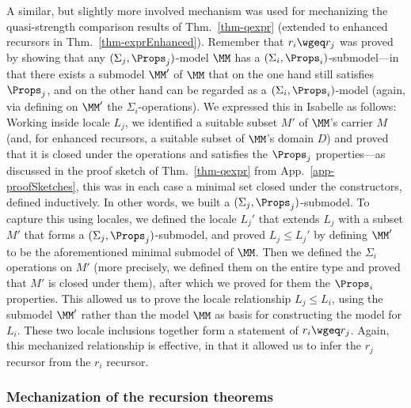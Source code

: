 A similar, but slightly more involved mechanism was used for mechanizing 
the quasi-strength comparison results of Thm.~\ref{thm-qexpr} 
(extended to enhanced recursors in Thm.~\ref{thm-exprEnhanced}). Remember that $r_i \wgeq r_j$ was proved by showing that any $(\Sigma_j,\Props_j)$-model $\MM$ has a $(\Sigma_i,\Props_i)$-submodel---in that there exists a submodel $\MM'$ of $\MM$ that on the one hand still satisfies $\Props_j$, and on the other hand can be regarded as a $(\Sigma_i,\Props_i)$-model (again, via defining on $\MM'$ the $\Sigma_i$-operations). We expressed this in Isabelle as follows: %
Working inside locale $L_j$, we identified a suitable subset $M'$ of $\MM$'s carrier $M$ (and, for enhanced recursors, a suitable subset of $\MM$'s domain 
$D$) and proved that it is closed under the operations and satisfies the $\Props_j$ properties---as discussed in the proof sketch of Thm.~\ref{thm-qexpr}  %
from App.~\ref{app-proofSketches}, this was in each case a minimal  set closed under the constructors, defined inductively. %
In other words, we built a $(\Sigma_j,\Props_j)$-submodel. To capture this using locales, we defined the locale $L_j'$ that extends $L_j$ with a subset $M'$ that forms a $(\Sigma_j,\Props_j)$-submodel, and proved $L_j \leq L_j'$ by defining $\MM'$ to be the aforementioned minimal submodel of $\MM$.  Then we defined the 
$\Sigma_i$ operations on $M'$ (more precisely, we defined them on the entire type and proved that $M'$ is closed under them), after which we 
proved for them the $\Props_i$ properties. This allowed us  to prove the locale relationship $L_j \leq L_i$, using the submodel $\MM'$ rather than the model $\MM$ as basis for constructing the model for $L_i$. 
These two locale inclusions together 
form a statement of $r_i \wgeq r_j$. Again, this mechanized relationship is effective, in that it allowed us to infer the $r_j$ recursor from the $r_i$ recursor. 


\subsubsection{Mechanization of the recursion theorems}

